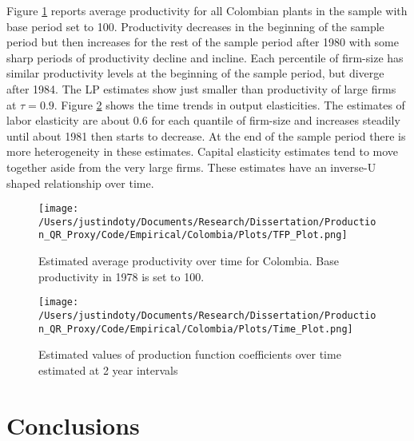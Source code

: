 \documentclass[11pt]{article}
\begin{document}


Figure \ref{fig:COLpgrowth} reports average productivity for all Colombian plants in the sample with base period set to 100. Productivity decreases in the beginning of the sample period but then increases for the rest of the sample period after 1980 with some sharp periods of productivity decline and incline. Each percentile of firm-size has similar productivity levels at the beginning of the sample period, but diverge after 1984. The LP estimates show just smaller than productivity of large firms at $\tau=0.9$. Figure \ref{fig:COLtimecoef} shows the time trends in output elasticities. The estimates of labor elasticity are about 0.6 for each quantile of firm-size and increases steadily until about 1981 then starts to decrease. At the end of the sample period there is more heterogeneity in these estimates. Capital elasticity estimates tend to move together aside from the very large firms. These estimates have an inverse-U shaped relationship over time.

\begin{figure}[H]
\centering
\texttt{[image: /Users/justindoty/Documents/Research/Dissertation/Production\_QR\_Proxy/Code/Empirical/Colombia/Plots/TFP\_Plot.png]}
\caption{Estimated average productivity over time for Colombia. Base productivity in 1978 is set to 100.}
\label{fig:COLpgrowth}
\end{figure}



\begin{figure}[H]
\centering
\texttt{[image: /Users/justindoty/Documents/Research/Dissertation/Production\_QR\_Proxy/Code/Empirical/Colombia/Plots/Time\_Plot.png]}
\caption{Estimated values of production function coefficients over time estimated at 2 year intervals}
\label{fig:COLtimecoef}
\end{figure}

\section{Conclusions} \label{conclusion}
\end{document}
